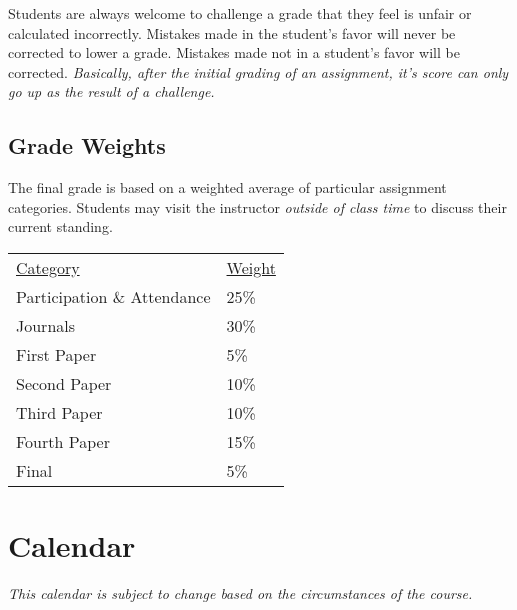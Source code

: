 \documentclass[nobib]{tufte-handout}
\begin{document}
Students are always welcome to challenge a grade that they feel is unfair or calculated incorrectly.  Mistakes made in the student's favor will never be corrected to lower a grade.  Mistakes made not in a student's favor will be corrected.  \textit{Basically, after the initial grading of an assignment, it's score can only go up as the result of a challenge.}


\subsection{Grade Weights}

The final grade is based on a weighted average of particular assignment categories.  Students may visit the instructor \textit{outside of class time} to discuss their current standing.

\begin{center}
\begin{tabular}{ll}
\underline{Category} & \underline{Weight}  \\
Participation \& Attendance & 25\% \\
Journals & 30\% \\
First Paper & 5\% \\
Second Paper & 10\% \\
Third Paper & 10\% \\
Fourth Paper & 15\% \\
Final & 5\% \\
\end{tabular}
\end{center}


\section{Calendar}

\textit{This calendar is subject to change based on the circumstances of the course.}
\end{document}

